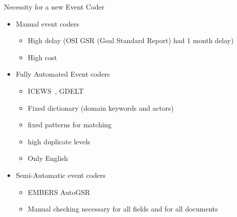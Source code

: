 \begin{frame}{Necessity for a new Event Coder}
\begin{itemize}
    \item Manual event coders
    \begin{itemize}
        \item  High delay (OSI GSR (Goal Standard Report) had 1 month delay)
        \item High cost
    \end{itemize}
    \item Fully Automated Event coders 
    \begin{itemize}
        \item ICEWS~\cite{boschee2015icews}, GDELT~\cite{leetaru2013gdelt}
        \item Fixed dictionary (domain keywords and actors)
        \item fixed patterns for matching
        \item high duplicate levels
        \item Only English
    \end{itemize}
    \item Semi-Automatic event coders 
    \begin{itemize}
        \item EMBERS AutoGSR~\cite{saraf2016embers}
        \item Manual checking necessary for all fields and for all documents
    \end{itemize}
\end{itemize}
\end{frame}


